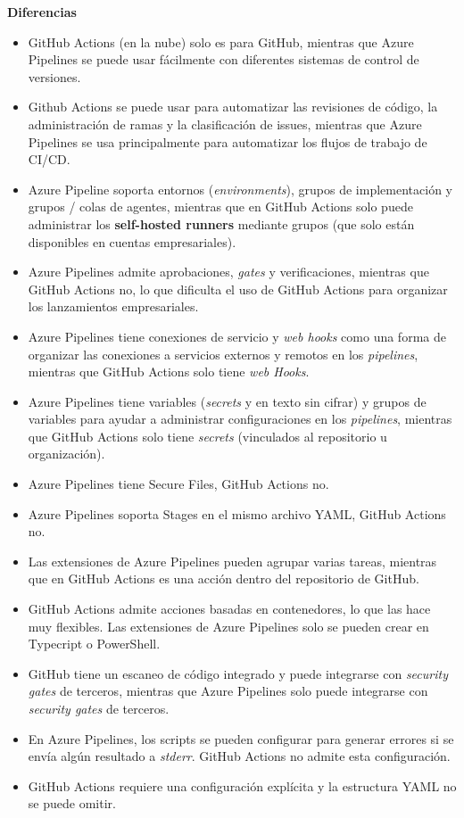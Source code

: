 \documentclass[twoside,twocolumn]{article}
\begin{document}
\textbf{Diferencias}

\begin{itemize}
    \item GitHub Actions (en la nube) solo es para GitHub, mientras que Azure Pipelines se puede usar fácilmente con diferentes sistemas de control de versiones.
    \item Github Actions se puede usar para automatizar las revisiones de código, la administración de ramas y la clasificación de issues, mientras que Azure Pipelines se usa principalmente para automatizar los flujos de trabajo de CI/CD.
    \item Azure Pipeline soporta entornos (\textit{environments}), grupos de implementación y grupos / colas de agentes, mientras que en GitHub Actions solo puede administrar los \textbf{self-hosted runners} mediante grupos (que solo están disponibles en cuentas empresariales).
    \item Azure Pipelines admite aprobaciones, \textit{gates} y verificaciones, mientras que GitHub Actions no, lo que dificulta el uso de GitHub Actions para organizar los lanzamientos empresariales.
    \item Azure Pipelines tiene conexiones de servicio y \textit{web hooks} como una forma de organizar las conexiones a servicios externos y remotos en los \textit{pipelines}, mientras que GitHub Actions solo tiene \textit{web Hooks}.
    \item Azure Pipelines tiene variables (\textit{secrets} y en texto sin cifrar) y grupos de variables para ayudar a administrar configuraciones en los \textit{pipelines}, mientras que GitHub Actions solo tiene \textit{secrets} (vinculados al repositorio u organización).
    \item Azure Pipelines tiene Secure Files, GitHub Actions no.
    \item Azure Pipelines soporta Stages en el mismo archivo YAML, GitHub Actions no.
    \item Las extensiones de Azure Pipelines pueden agrupar varias tareas, mientras que en GitHub Actions es una acción dentro del repositorio de GitHub.
    \item GitHub Actions admite acciones basadas en contenedores, lo que las hace muy flexibles. Las extensiones de Azure Pipelines solo se pueden crear en Typecript o PowerShell.
    \item GitHub tiene un escaneo de código integrado y puede integrarse con \textit{security gates} de terceros, mientras que Azure Pipelines solo puede integrarse con \textit{security gates} de terceros.
    \item En Azure Pipelines, los scripts se pueden configurar para generar errores si se envía algún resultado a \textit{stderr}. GitHub Actions no admite esta configuración.
    \item GitHub Actions requiere una configuración explícita y la estructura YAML no se puede omitir.
\end{itemize}
\end{document}
